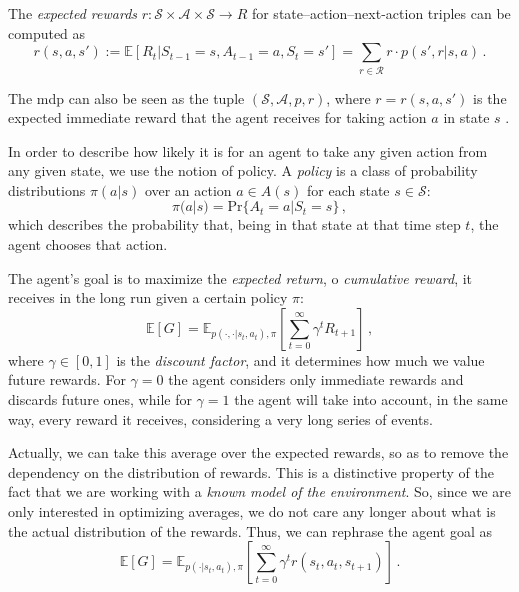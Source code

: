 The \emph{expected rewards} $r: \mathcal S \times \mathcal A \times \mathcal S \to R$ for state--action--next-action triples can be computed as
\begin{equation}
    r(s, a, s') := \mathbb E \left[ R_t | S_{t-1} = s, A_{t-1} = a, S_t = s' \right] = \sum_{r \in \mathcal R} r \cdot p(s', r | s, a) \, .
\end{equation}

The \acrshort{mdp} can also be seen as the tuple $(\mathcal S, \mathcal A, p, r)$, where $r = r(s,a,s')$ is the expected immediate reward that the agent receives for taking action $a$ in state $s$ \cite{Kaelbling1998, Uther2010}.

In order to describe how likely it is for an agent to take any given action from any given state, we use the notion of policy. A \emph{policy} is a class of probability distributions $\pi(a|s)$ over an action $a \in A(s)$ for each state $s \in \mathcal S$:
\begin{equation}
    \pi(a|s) = \text{Pr} \{A_t = a | S_t = s\} \, ,
    \label{eq:policy-theory}
\end{equation}
which describes the probability that, being in that state at that time step $t$, the agent chooses that action.

The agent's goal is to maximize the \emph{expected return}, o \emph{cumulative reward}, it receives in the long run given a certain policy $\pi$:
\begin{equation}
    \mathbb E [G] = \mathbb E_{p(\cdot,\cdot|s_t,a_t), \pi} \left[ \sum_{t=0}^\infty \gamma^t R_{t+1} \right] \, ,
    \label{eq:goal}
\end{equation}
where $\gamma \in [0,1]$ is the \emph{discount factor}, and it determines how much we value future rewards. For $\gamma = 0$ the agent considers only immediate rewards and discards future ones, while for $\gamma = 1$ the agent will take into account, in the same way, every reward it receives, considering a very long series of events.

Actually, we can take this average over the expected rewards, so as to remove the dependency on the distribution of rewards. This is a distinctive property of the fact that we are working with a \textit{known model of the environment}. So, since we are only interested in optimizing averages, we do not care any longer about what is the actual distribution of the rewards. Thus, we can rephrase the agent goal as
\begin{equation}
    \mathbb E [G] = \mathbb E_{p(\cdot|s_t,a_t), \pi} \left[ \sum_{t=0}^\infty \gamma^t r(s_t, a_t, s_{t+1}) \right] \, .
    \label{eq:goal-average}
\end{equation}

